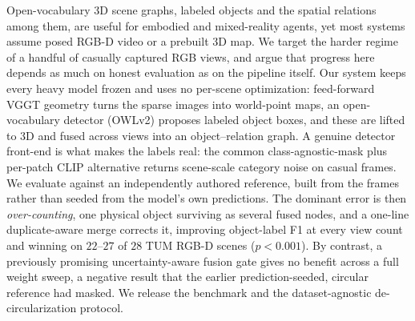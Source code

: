 Open-vocabulary 3D scene graphs, labeled objects and the spatial relations among them, are
useful for embodied and mixed-reality agents, yet most systems assume posed RGB-D video or a prebuilt
3D map. We target the harder regime of a handful of casually captured RGB views, and argue that
progress here depends as much on honest evaluation as on the pipeline itself. Our system keeps every
heavy model frozen and uses no per-scene optimization: feed-forward VGGT geometry turns the sparse images
into world-point maps, an open-vocabulary detector (OWLv2) proposes labeled object boxes, and these are
lifted to 3D and fused across views into an object--relation graph. A genuine detector front-end is what
makes the labels real: the common class-agnostic-mask plus per-patch CLIP alternative returns scene-scale
category noise on casual frames. We evaluate against an independently authored reference, built from the
frames rather than seeded from the model's own predictions. The dominant error is then \emph{over-counting},
one physical object surviving as several fused nodes, and a one-line duplicate-aware merge corrects it,
improving object-label F1 at every view count and winning on $22$--$27$ of $28$ TUM RGB-D scenes
($p<0.001$). By contrast, a previously
promising uncertainty-aware fusion gate gives no benefit across a full weight sweep, a negative result
that the earlier prediction-seeded, circular reference had masked. We release the benchmark and the
dataset-agnostic de-circularization protocol.

